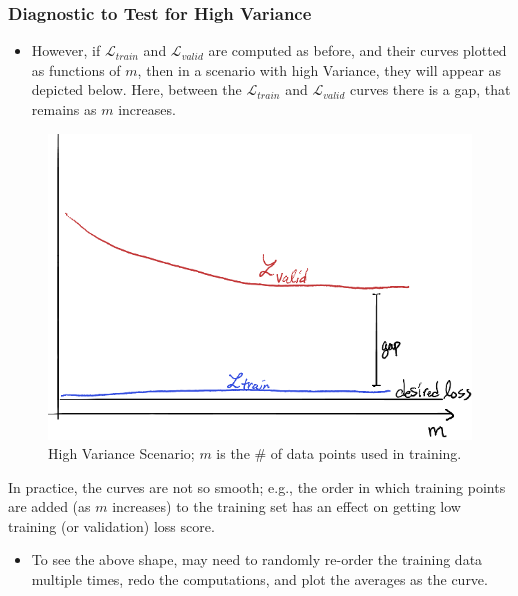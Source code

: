 \documentclass[smaller]{beamer}
\theoremstyle{example}
\begin{document}
\begin{frame}
    \frametitle{Diagnostic to Test for High Variance}
    \begin{itemize}
        \item However, if $\mathcal L_{train}$ and $\mathcal L_{valid}$ are computed as before, and their curves plotted as functions of $m$, then in a scenario with high Variance, they will appear as depicted below. Here, between the $\mathcal L_{train}$ and $\mathcal L_{valid}$ curves there is a gap, that remains as $m$ increases. 
    \end{itemize}

    \begin{figure}
        \begin{center}
            \includegraphics[height=0.3\textheight]{../../Images/high-variance-schematic.png}
        \end{center}
        \caption{High Variance Scenario; $m$ is the \# of data points used in training.}
    \end{figure}

    \pause
    In practice, the curves are not so smooth; e.g., the order in which training points are added (as $m$ increases) to the training set has an effect on getting low training (or validation) loss score. 
    \pause
    \begin{itemize}
        \item To see the above shape, may need to randomly re-order the training data multiple times, redo the computations, and plot the averages as the curve.
    \end{itemize}
\end{frame}
\end{document}
